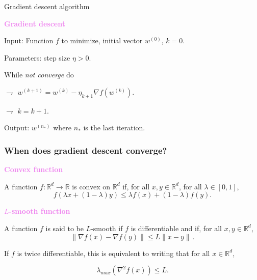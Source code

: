 \documentclass[9pt]{beamer}
\newcommand\R{\mathds{R}}
\begin{document}
\begin{frame}{Gradient descent algorithm}
	


\textbf{\textcolor{violet}{Gradient descent}}
		
\alert{Input}: Function $f$ to minimize, initial vector $w^{(0)}$, $k=0$.

\medskip 
	
	
\alert{Parameters}: step size $\eta>0$.

\medskip
	
While \textit{not converge} do


\hspace{2cm} $\rightharpoondown$ $w^{(k+1)} = w^{(k)} - \eta_{k+1} \nabla f(w^{(k)})$.

\hspace{2cm} $\rightharpoondown$ $k = k+1$.

\medskip

\alert{Output}: $w^{(n_*)}$ where $n_*$ is the last iteration.

	
\end{frame}




\begin{frame}
	\frametitle{When does gradient descent converge?}
	
\textbf{\textcolor{violet}{Convex function}}

A function $f : \R^d \to \R$ is \alert{convex} on $\R^d$ if, for all $x, y \in \R^d$, for all $\lambda \in [0,1]$,
$$
f(\lambda x + (1- \lambda) y ) \leq \lambda f(x) + (1 - \lambda) f(y).
$$	
	

\vspace{.4cm}
	
\textbf{\textcolor{violet}{$L$-smooth function}}

A function $f$ is said to be \alert{$L$-smooth} if $f$ is differentiable and if, for all $x, y \in \R^d$, 
$$
\| \nabla f(x) - \nabla f(y) \| \leqslant L \|x-y\|\,.
$$
	
If $f$ is \alert{twice differentiable}, this is equivalent to writing that for all $x \in \R^d$,  
	
$$
\lambda_{max} (\nabla^2 f(x)) \leqslant L.
$$
	
\end{frame}
\end{document}
